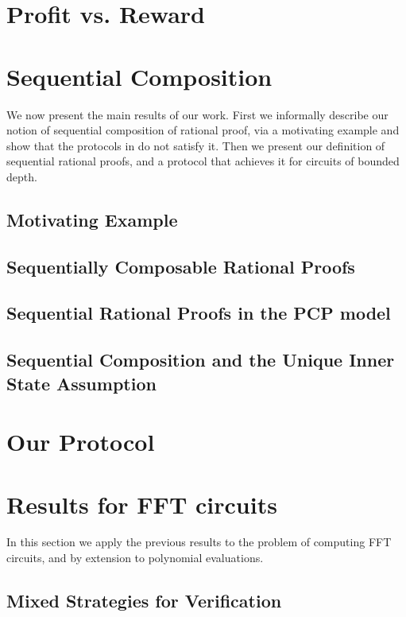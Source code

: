 
\section{Profit vs. Reward}


\section{Sequential Composition}
We now present the main results of our work. First we informally describe our notion of sequential composition of 
rational proof, via a motivating example and show that the protocols in \cite{am,am1,rosen} do not satisfy it. Then we present our definition of sequential rational proofs, and a protocol that achieves it for circuits of bounded depth. 


\subsection{Motivating Example}


\subsection{Sequentially Composable Rational Proofs}


\subsection{Sequential Rational Proofs in the PCP model}


\subsection{Sequential Composition and the Unique Inner State Assumption}
\label{sec:uisa}


\section{Our Protocol}
\label{sec:our-protocol}


\section{Results for FFT circuits}

In this section we apply the previous results to the problem of computing FFT circuits, and by extension to polynomial evaluations. 


\subsection{Mixed Strategies for Verification}


